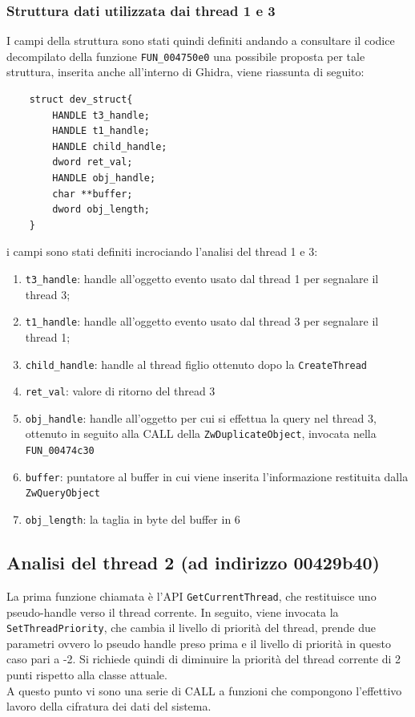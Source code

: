 \documentclass[12pt]{extarticle}
\begin{document}
\subsubsection{Struttura dati utilizzata dai thread 1 e 3}
I campi della struttura sono stati quindi definiti andando a consultare il codice decompilato della funzione \texttt{FUN\_004750e0} una possibile proposta per tale struttura, inserita anche all'interno di Ghidra, viene riassunta di seguito:
\begin{lstlisting}
    struct dev_struct{
        HANDLE t3_handle;
        HANDLE t1_handle;
        HANDLE child_handle;
        dword ret_val;
        HANDLE obj_handle;
        char **buffer;
        dword obj_length;
    }
\end{lstlisting}
i campi sono stati definiti incrociando l'analisi del thread 1 e 3:
\begin{enumerate}
    \item \texttt{t3\_handle}: handle all'oggetto evento usato dal thread 1 per segnalare il thread 3;
    \item \texttt{t1\_handle}: handle all'oggetto evento usato dal thread 3 per segnalare il thread 1;
    \item \texttt{child\_handle}: handle al thread figlio ottenuto dopo la \texttt{CreateThread}
    \item \texttt{ret\_val}: valore di ritorno del thread 3
    \item \texttt{obj\_handle}: handle all'oggetto per cui si effettua la query nel thread 3, ottenuto in seguito alla CALL della \texttt{ZwDuplicateObject}, invocata nella \texttt{FUN\_00474c30}
    \item \texttt{buffer}: puntatore al buffer in cui viene inserita l'informazione restituita dalla \texttt{ZwQueryObject}
    \item \texttt{obj\_length}: la taglia in byte del buffer in 6
\end{enumerate}

\subsection{Analisi del thread 2 (ad indirizzo 00429b40)}
La prima funzione chiamata è l'API \texttt{GetCurrentThread}, che restituisce uno pseudo-handle verso il thread corrente. In seguito, viene invocata la \texttt{SetThreadPriority}, che cambia il livello di priorità del thread, prende due parametri ovvero lo pseudo handle preso prima e il livello di priorità in questo caso pari a -2. Si richiede quindi di diminuire la priorità del thread corrente di 2 punti rispetto alla classe attuale.\\A questo punto vi sono una serie di CALL a funzioni che compongono l'effettivo lavoro della cifratura dei dati del sistema.
\end{document}
